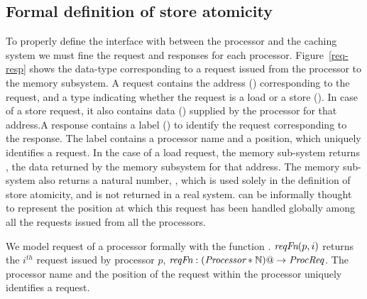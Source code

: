 
\subsection{Formal definition of store atomicity}

To properly define the interface with between the processor and the
caching system we must fine the request and responses for each
processor.  Figure~\ref{req-resp} shows the
data-type corresponding to a request issued from the processor to the
memory subsystem.  A request contains the address (\addrQ)
corresponding to the request, and a type indicating whether the
request is a load or a store (\desc). In case of a store request, it
also contains data (\dataQ) supplied by the processor for that
address.A response contains a label
() to identify the request corresponding to the response. The label
contains a processor name and a position, which uniquely identifies a request.
In the case of a load request, the memory sub-system returns \dataR, the data
returned by the memory subsystem for that address. The memory sub-system also
returns a natural number, \timeR, which is used solely in the definition of
store atomicity, and is not returned in a real system. \timeR{} can be informally
thought to represent the position at which this request has been handled
globally among all the requests issued from all the processors.

We model request of a processor formally with the function
\reqFn. $\textit{reqFn}(p, i)$ returns the $i^{th}$ request issued by
processor $p$, \ie{} $\textit{reqFn}: (\textit{Processor} * \mathbb{N}) @->
\textit{ProcReq}$.  The processor name and the position of the request within
the processor uniquely identifies a request.

